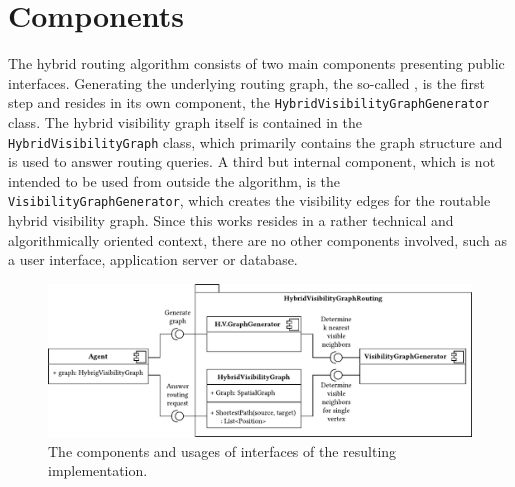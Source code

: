 \section{Components}
\label{sec:components}

	The hybrid routing algorithm consists of two main components presenting public interfaces.
	Generating the underlying routing graph, the so-called , is the first step and resides in its own component, the \texttt{HybridVisibilityGraphGenerator} class.
	The hybrid visibility graph itself is contained in the \texttt{HybridVisibilityGraph} class, which primarily contains the graph structure and is used to answer routing queries.
	A third but internal component, which is not intended to be used from outside the algorithm, is the \texttt{VisibilityGraphGenerator}, which creates the visibility edges for the routable hybrid visibility graph.
	Since this works resides in a rather technical and algorithmically oriented context, there are no other components involved, such as a user interface, application server or database.
	
	\begin{figure}[h]
		\begin{figcenter}
			\includegraphics[scale=0.8]{images/components.pdf}
		\end{figcenter}
		\caption{The components and usages of interfaces of the resulting implementation.}
		\label{fig:components}
	\end{figure}
	
